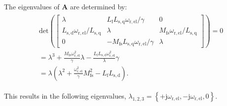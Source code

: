 \begin{solutionblock}
    The eigenvalues of $\bm{A}$ are determined by:
    \begin{align}
        \begin{split}
        &\mathrm{det}\left(
            \begin{bmatrix}
                \lambda & L_{\mathrm{f}}L_{\mathrm{s,q}}\omega_{\mathrm{r,el}} /\gamma & 0 \\
                L_{\mathrm{s,d}}\omega_{\mathrm{r,el}} / L_{\mathrm{s,q}} & \lambda & M_{\mathrm{fs}}\omega_{\mathrm{r,el}}/L_{\mathrm{s,q}} \\
                0 & -M_{\mathrm{fs}}L_{\mathrm{s,q}}\omega_{\mathrm{r,el}} / \gamma & \lambda
            \end{bmatrix}
        \right)
        = 0 \\
        &= \lambda^3 + \frac{M_{\mathrm{fs}}\omega_{\mathrm{r,el}}^2}{\gamma}\lambda - \frac{L_{\mathrm{f}}L_{\mathrm{s,d}}\omega_{\mathrm{r,el}}^2}{\lambda}\gamma \\
        &= \lambda\left(\lambda^2+\frac{\omega_{\mathrm{r,el}}^2}{\gamma}M_{\mathrm{fs}}^2-L_{\mathrm{f}}L_{\mathrm{s,d}}\right).
    \end{split}
    \end{align}

    This results in the following eigenvalues, $\lambda_{\mathrm{1,2,3}} = \left\{+\mathrm{j}\omega_{\mathrm{r,el}}, -\mathrm{j}\omega_{\mathrm{r,el}}, 0 \right\}$.



\end{solutionblock}
